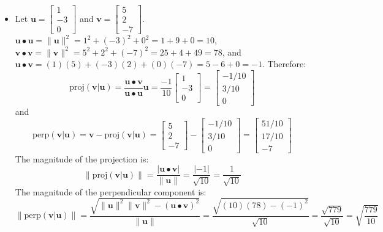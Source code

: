\documentclass{article}
\begin{document}
\begin{itemize}
\item Let \(\mathbf{u} = \begin{bmatrix} 1 \\ -3 \\ 0 \end{bmatrix}\) and \(\mathbf{v} = \begin{bmatrix} 5 \\ 2 \\ -7 \end{bmatrix}\). \\
\(\mathbf{u} \bullet \mathbf{u} = \|\mathbf{u}\|^2 = 1^2 + (-3)^2 + 0^2 = 1 + 9 + 0 = 10\), \\
\(\mathbf{v} \bullet \mathbf{v} = \|\mathbf{v}\|^2 = 5^2 + 2^2 + (-7)^2 = 25 + 4 + 49 = 78\), and \\
\(\mathbf{u} \bullet \mathbf{v} = (1)(5) + (-3)(2) + (0)(-7) = 5 - 6 + 0 = -1\). Therefore: 
\[\text{proj}(\mathbf{v}|\mathbf{u}) = \frac{\mathbf{u} \bullet \mathbf{v}}{\mathbf{u} \bullet \mathbf{u}}\mathbf{u} = \frac{-1}{10}\begin{bmatrix} 1 \\ -3 \\ 0 \end{bmatrix} = \begin{bmatrix} -1/10 \\ 3/10 \\ 0 \end{bmatrix}\]  
and 
\[\text{perp}(\mathbf{v}|\mathbf{u}) = \mathbf{v} - \text{proj}(\mathbf{v}|\mathbf{u}) = \begin{bmatrix} 5 \\ 2 \\ -7 \end{bmatrix} - \begin{bmatrix} -1/10 \\ 3/10 \\ 0 \end{bmatrix} = \begin{bmatrix} 51/10 \\ 17/10 \\ -7 \end{bmatrix}\]
The magnitude of the projection is:
\[\|\text{proj}(\mathbf{v}|\mathbf{u})\| = \frac{|\mathbf{u} \bullet \mathbf{v}|}{\|\mathbf{u}\|} = \frac{|-1|}{\sqrt{10}} = \frac{1}{\sqrt{10}}\]
The magnitude of the perpendicular component is:
\[\|\text{perp}(\mathbf{v}|\mathbf{u})\| = \frac{\sqrt{\|\mathbf{u}\|^2\|\mathbf{v}\|^2 - (\mathbf{u} \bullet \mathbf{v})^2}}{\|\mathbf{u}\|} = \frac{\sqrt{(10)(78) - (-1)^2}}{\sqrt{10}} = \frac{\sqrt{779}}{\sqrt{10}} = \sqrt{\frac{779}{10}}\]
\end{itemize}
\end{document}
